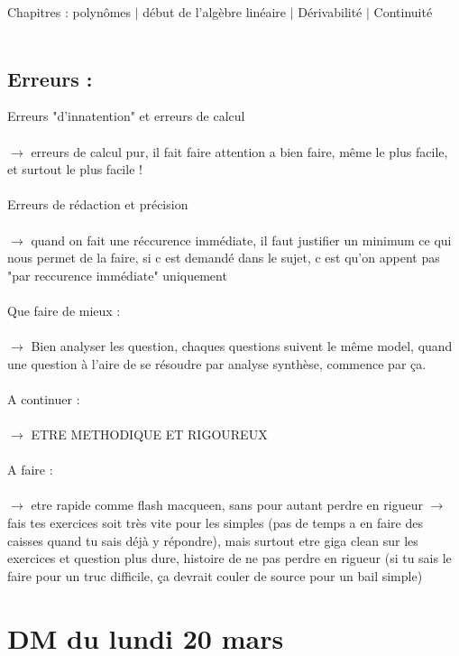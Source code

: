 \documentclass{book}
\begin{document}
Chapitres : polynômes $|$ début de l'algèbre linéaire $|$ Dérivabilité $|$ Continuité \\ \\

\subsection{Erreurs :}

Erreurs "d'innatention" et erreurs de calcul \\ \\
$\rightarrow$ erreurs de calcul pur, il fait faire attention a bien faire, même le plus facile, et surtout le plus facile ! \\ \\

Erreurs de rédaction et précision\\ \\
$\rightarrow$ quand on fait une réccurence immédiate, il faut justifier un minimum ce qui nous permet de la faire, si c est demandé dans le sujet, c est qu'on appent pas "par reccurence immédiate" uniquement \\ \\

Que faire de mieux : \\ \\
$\rightarrow$ Bien analyser les question, chaques questions suivent le même model, quand une question à l'aire de se résoudre par analyse synthèse, commence par ça. \\ \\

A continuer : \\ \\
$\rightarrow$ ETRE METHODIQUE ET RIGOUREUX \\ \\

A faire : \\ \\
$\rightarrow$ etre rapide comme flash macqueen, sans pour autant perdre en rigueur $\rightarrow$ fais tes exercices soit très vite pour les simples (pas de temps a en faire des caisses quand tu sais déjà y répondre), mais surtout etre giga clean sur les exercices et question plus dure, histoire de ne pas perdre en rigueur (si tu sais le faire pour un truc difficile, ça devrait couler de source pour un bail simple)






\section{DM du lundi 20 mars }
\end{document}
